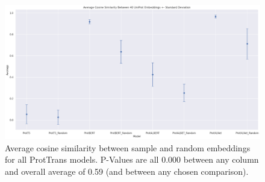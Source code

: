 \begin{figure}[H]
    \begin{center}
	   \includegraphics[width=1.0\linewidth]{figures/random_vs_nonrandom_cossim.png}
    \end{center}
    \caption{Average cosine similarity between sample and random embeddings for all ProtTrans models. P-Values are all \(0.000\) between any column and overall average of 0.59 (and between any chosen comparison).}
    \label{fig:random_vs_nonrandom_cossim}
\end{figure}
